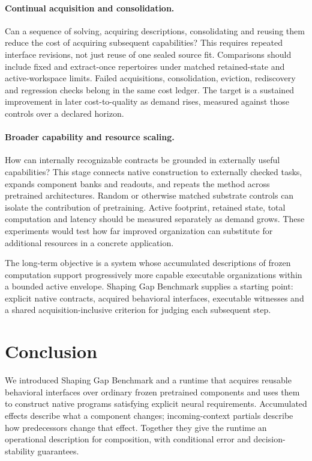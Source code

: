 \documentclass[11pt]{article}
\begin{document}
\paragraph{Continual acquisition and consolidation.}
Can a sequence of solving, acquiring descriptions, consolidating and reusing
them reduce the cost of acquiring subsequent capabilities? This requires
repeated interface revisions, not just reuse of one sealed source fit.
Comparisons should include fixed and extract-once repertoires under matched
retained-state and active-workspace limits. Failed acquisitions, consolidation,
eviction, rediscovery and regression checks belong in the same cost ledger.
The target is a sustained improvement in later cost-to-quality as demand rises,
measured against those controls over a declared horizon.

\paragraph{Broader capability and resource scaling.}
How can internally recognizable contracts be grounded in externally useful
capabilities? This stage connects native construction to externally checked
tasks, expands component banks and readouts, and repeats the method across
pretrained architectures. Random or otherwise matched substrate controls can
isolate the contribution of pretraining. Active footprint, retained state,
total computation and latency should be measured separately as demand grows.
These experiments would test how far improved organization can substitute for
additional resources in a concrete application.

The long-term objective is a system whose accumulated descriptions of frozen
computation support progressively more capable executable organizations within
a bounded active envelope. Shaping Gap Benchmark supplies a starting point:
explicit native contracts, acquired behavioral interfaces, executable witnesses
and a shared acquisition-inclusive criterion for judging each subsequent step.

\section{Conclusion}
We introduced Shaping Gap Benchmark and a runtime that acquires reusable behavioral interfaces over
ordinary frozen pretrained components and uses them to construct native
programs satisfying explicit neural requirements. Accumulated effects describe
what a component changes; incoming-context partials describe how predecessors
change that effect. Together they give the runtime an operational description
for composition, with conditional error and decision-stability guarantees.
\end{document}
